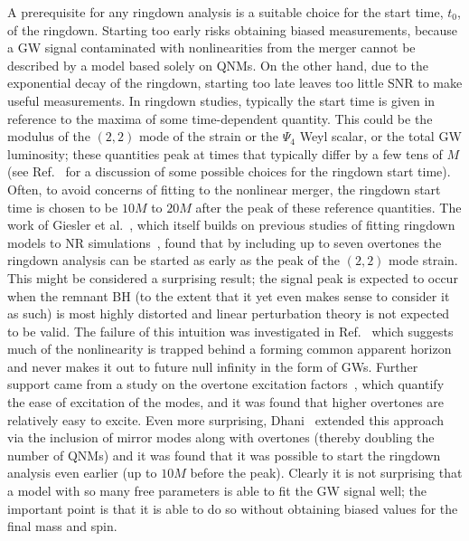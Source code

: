 A prerequisite for any ringdown analysis is a suitable choice for the start time, $t_0$, of the ringdown. 
Starting too early risks obtaining biased measurements, because a GW signal contaminated with nonlinearities from the merger cannot be described by a model based solely on QNMs.
On the other hand, due to the exponential decay of the ringdown, starting too late leaves too little SNR to make useful measurements. 
In ringdown studies, typically the start time is given in reference to the maxima of some time-dependent quantity.
This could be the modulus of the $(2,2)$ mode of the strain or the $\Psi_4$ Weyl scalar, or the total GW luminosity; these quantities peak at times that typically differ by a few tens of $M$ (see Ref.~\cite{Berti:2007fi} for a discussion of some possible choices for the ringdown start time).
Often, to avoid concerns of fitting to the nonlinear merger, the ringdown start time is chosen to be $10M$ to $20M$ after the peak of these reference quantities. 
The work of Giesler et al.~\cite{Giesler:2019uxc}, which itself builds on previous studies of fitting ringdown models to NR simulations~\cite{Dorband:2006gg, Buonanno:2006ui, Berti:2007fi, Kamaretsos:2011um, Kamaretsos:2012bs, London:2014cma, Baibhav:2017jhs}, found that by including up to seven overtones the ringdown analysis can be started as early as the peak of the $(2,2)$ mode strain. 
This might be considered a surprising result; the signal peak is expected to occur when the remnant BH (to the extent that it yet even makes sense to consider it as such) is most highly distorted and linear perturbation theory is not expected to be valid. 
The failure of this intuition was investigated in Ref.~\cite{Okounkova:2020vwu} which suggests much of the nonlinearity is trapped behind a forming common apparent horizon and never makes it out to future null infinity in the form of GWs. 
Further support came from a study on the overtone excitation factors~\cite{Oshita:2021iyn}, which quantify the ease of excitation of the modes, and it was found that higher overtones are relatively easy to excite.
Even more surprising, Dhani~\cite{Dhani:2020nik} extended this approach via the inclusion of mirror modes along with overtones (thereby doubling the number of QNMs) and it was found that it was possible to start the ringdown analysis even earlier (up to $10M$ before the peak). 
Clearly it is not surprising that a model with so many free parameters is able to fit the GW signal well; the important point is that it is able to do so without obtaining biased values for the final mass and spin. 

